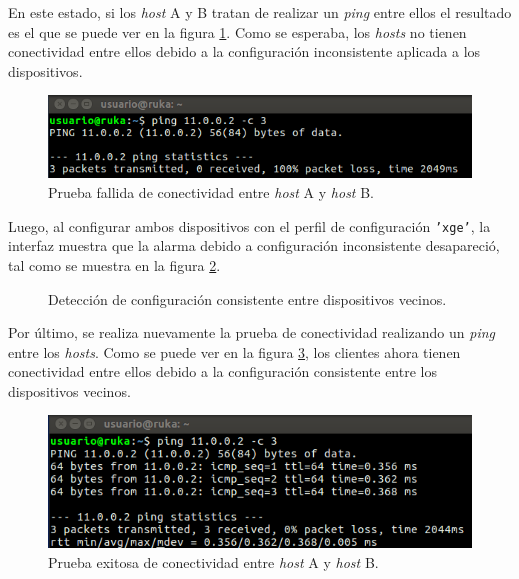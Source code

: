       En este estado, si los \textit{host} A y B tratan de realizar un \textit{ping} entre ellos el resultado es el que se puede ver en la figura \ref{fig:test9_2}. Como se esperaba, los \textit{hosts} no tienen conectividad entre ellos debido a la configuración inconsistente aplicada a los dispositivos.

      \begin{figure}[H]
        \centering
        \includegraphics[scale=0.7]{Figures/test9_2.png}
        \caption{Prueba fallida de conectividad entre \textit{host} A y \textit{host} B.}
        \label{fig:test9_2}
      \end{figure}

      Luego, al configurar ambos dispositivos con el perfil de configuración \texttt{'xge'}, la interfaz muestra que la alarma debido a configuración inconsistente desapareció, tal como se muestra en la figura \ref{fig:test9_3}.


      \begin{figure}[H]
        \centering
        \caption{Detección de configuración consistente entre dispositivos vecinos.}
        \label{fig:test9_3}
      \end{figure}

      Por último, se realiza nuevamente la prueba de conectividad realizando un \textit{ping} entre los \textit{hosts}. Como se puede ver en la figura \ref{fig:test9_4}, los clientes ahora tienen conectividad entre ellos debido a la configuración consistente entre los dispositivos vecinos.

      \begin{figure}[H]
        \centering
        \includegraphics[scale=0.7]{Figures/test9_4.png}
        \caption{Prueba exitosa de conectividad entre \textit{host} A y \textit{host} B.}
        \label{fig:test9_4}
      \end{figure}
